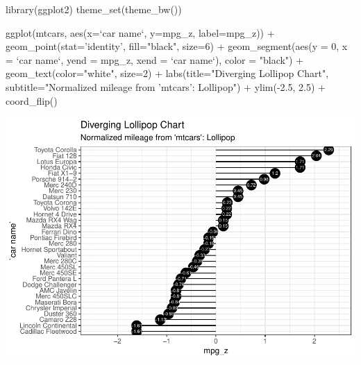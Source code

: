 \documentclass[a4paper]{article}
\newenvironment{Shaded}{}{}
\newcommand{\KeywordTok}[1]{\textcolor[rgb]{0.00,0.00,1.00}{#1}}
\newcommand{\DataTypeTok}[1]{#1}
\newcommand{\DecValTok}[1]{#1}
\newcommand{\FloatTok}[1]{#1}
\newcommand{\StringTok}[1]{\textcolor[rgb]{0.00,0.50,0.50}{#1}}
\newcommand{\OperatorTok}[1]{#1}
\newcommand{\NormalTok}[1]{#1}
\begin{document}
\begin{Shaded}
\begin{Highlighting}[]
\KeywordTok{library}\NormalTok{(ggplot2)}
\KeywordTok{theme_set}\NormalTok{(}\KeywordTok{theme_bw}\NormalTok{())}

\KeywordTok{ggplot}\NormalTok{(mtcars, }\KeywordTok{aes}\NormalTok{(}\DataTypeTok{x=}\StringTok{`}\DataTypeTok{car name}\StringTok{`}\NormalTok{, }\DataTypeTok{y=}\NormalTok{mpg_z, }\DataTypeTok{label=}\NormalTok{mpg_z)) }\OperatorTok{+}\StringTok{ }
\StringTok{  }\KeywordTok{geom_point}\NormalTok{(}\DataTypeTok{stat=}\StringTok{'identity'}\NormalTok{, }\DataTypeTok{fill=}\StringTok{"black"}\NormalTok{, }\DataTypeTok{size=}\DecValTok{6}\NormalTok{)  }\OperatorTok{+}
\StringTok{  }\KeywordTok{geom_segment}\NormalTok{(}\KeywordTok{aes}\NormalTok{(}\DataTypeTok{y =} \DecValTok{0}\NormalTok{, }
                   \DataTypeTok{x =} \StringTok{`}\DataTypeTok{car name}\StringTok{`}\NormalTok{, }
                   \DataTypeTok{yend =}\NormalTok{ mpg_z, }
                   \DataTypeTok{xend =} \StringTok{`}\DataTypeTok{car name}\StringTok{`}\NormalTok{), }
               \DataTypeTok{color =} \StringTok{"black"}\NormalTok{) }\OperatorTok{+}
\StringTok{  }\KeywordTok{geom_text}\NormalTok{(}\DataTypeTok{color=}\StringTok{"white"}\NormalTok{, }\DataTypeTok{size=}\DecValTok{2}\NormalTok{) }\OperatorTok{+}
\StringTok{  }\KeywordTok{labs}\NormalTok{(}\DataTypeTok{title=}\StringTok{"Diverging Lollipop Chart"}\NormalTok{, }
       \DataTypeTok{subtitle=}\StringTok{"Normalized mileage from 'mtcars': Lollipop"}\NormalTok{) }\OperatorTok{+}\StringTok{ }
\StringTok{  }\KeywordTok{ylim}\NormalTok{(}\OperatorTok{-}\FloatTok{2.5}\NormalTok{, }\FloatTok{2.5}\NormalTok{) }\OperatorTok{+}
\StringTok{  }\KeywordTok{coord_flip}\NormalTok{()}
\end{Highlighting}
\end{Shaded}

\includegraphics{M24-ggplot2_Gallery_files/figure-latex/unnamed-chunk-13-1.pdf}
\newpage
\end{document}
